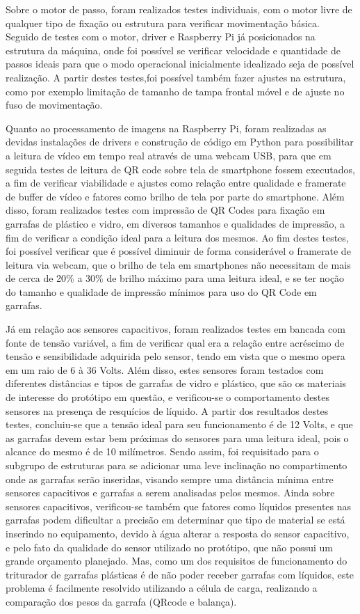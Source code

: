 Sobre o motor de passo, foram realizados testes individuais, com o motor livre de qualquer tipo de fixação ou estrutura para verificar movimentação básica. Seguido de testes com o motor, driver e Raspberry Pi já posicionados na estrutura da máquina, onde foi possível se verificar velocidade e quantidade de passos ideais para que o modo operacional inicialmente idealizado seja de possível realização. A partir destes testes,foi possível também fazer ajustes na estrutura, como por exemplo limitação de tamanho de tampa frontal móvel e de ajuste no fuso de movimentação.

Quanto ao processamento de imagens na Raspberry Pi, foram realizadas as devidas instalações de drivers e construção de código em Python para possibilitar a leitura de vídeo em tempo real através de uma webcam USB, para que em seguida testes de leitura de QR code sobre tela de smartphone fossem executados, a fim de verificar viabilidade e ajustes como relação entre qualidade e framerate de buffer de vídeo e fatores como brilho de tela por parte do smartphone. Além disso, foram realizados testes com impressão de QR Codes para fixação em garrafas de plástico e vidro, em diversos tamanhos e qualidades de impressão, a fim de verificar a condição ideal para a leitura dos mesmos. Ao fim destes testes, foi possível verificar que é possível diminuir de forma considerável o framerate de leitura via webcam, que o brilho de tela em smartphones não necessitam de mais de cerca de  20\% a 30\% de brilho máximo para uma leitura ideal, e se ter noção do tamanho e qualidade de impressão mínimos para uso do QR Code em garrafas.

Já em relação aos sensores capacitivos, foram realizados testes em bancada com fonte de tensão variável, a fim de verificar qual era a relação entre acréscimo de tensão e sensibilidade adquirida pelo sensor, tendo em vista que o mesmo opera em um raio de 6 à 36 Volts. Além disso, estes sensores foram testados com diferentes distâncias e tipos de garrafas de vidro e plástico, que são os materiais de interesse do protótipo em questão, e verificou-se o comportamento destes sensores na presença de resquícios de líquido. A partir dos resultados destes testes, concluiu-se que a tensão ideal para seu funcionamento é de 12 Volts, e que as garrafas devem estar bem próximas do sensores para uma leitura ideal, pois o alcance do mesmo é de 10 milímetros. Sendo assim, foi requisitado para o subgrupo de estruturas para se adicionar uma leve inclinação no compartimento onde as garrafas serão inseridas, visando sempre uma distância mínima entre sensores capacitivos e garrafas a serem analisadas pelos mesmos. 
Ainda sobre sensores capacitivos, verificou-se também que fatores como líquidos presentes nas garrafas podem dificultar a precisão em determinar que tipo de material se está inserindo no equipamento, devido à água alterar a resposta do sensor capacitivo, e pelo fato da qualidade do sensor utilizado no protótipo, que não possui um grande orçamento planejado. Mas, como um dos requisitos de funcionamento do triturador de garrafas plásticas é de não poder receber garrafas com líquidos, este problema é facilmente resolvido utilizando a célula de carga, realizando a comparação dos pesos da garrafa (QRcode e balança).

